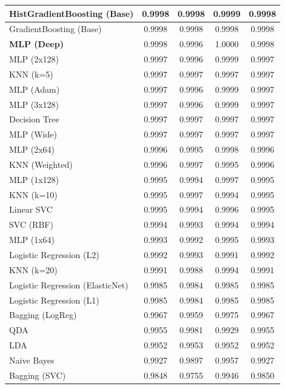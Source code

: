 \begin{small}
\begin{longtable}{|l|c|c|c|c|}
HistGradientBoosting (Base) & 0.9998 & 0.9998 & 0.9999 & 0.9998 \\ \hline
GradientBoosting (Base) & 0.9998 & 0.9998 & 0.9998 & 0.9998 \\ \hline
\textbf{MLP (Deep)} & 0.9998 & 0.9996 & 1.0000 & 0.9998 \\ \hline
MLP (2x128) & 0.9997 & 0.9996 & 0.9999 & 0.9997 \\ \hline
KNN (k=5) & 0.9997 & 0.9997 & 0.9997 & 0.9997 \\ \hline
MLP (Adam) & 0.9997 & 0.9996 & 0.9999 & 0.9997 \\ \hline
MLP (3x128) & 0.9997 & 0.9996 & 0.9999 & 0.9997 \\ \hline
Decision Tree & 0.9997 & 0.9997 & 0.9997 & 0.9997 \\ \hline
MLP (Wide) & 0.9997 & 0.9997 & 0.9997 & 0.9997 \\ \hline
MLP (2x64) & 0.9996 & 0.9995 & 0.9998 & 0.9996 \\ \hline
KNN (Weighted) & 0.9996 & 0.9997 & 0.9995 & 0.9996 \\ \hline
MLP (1x128) & 0.9995 & 0.9994 & 0.9997 & 0.9995 \\ \hline
KNN (k=10) & 0.9995 & 0.9997 & 0.9994 & 0.9995 \\ \hline
Linear SVC & 0.9995 & 0.9994 & 0.9996 & 0.9995 \\ \hline
SVC (RBF) & 0.9994 & 0.9993 & 0.9994 & 0.9994 \\ \hline
MLP (1x64) & 0.9993 & 0.9992 & 0.9995 & 0.9993 \\ \hline
Logistic Regression (L2) & 0.9992 & 0.9993 & 0.9991 & 0.9992 \\ \hline
KNN (k=20) & 0.9991 & 0.9988 & 0.9994 & 0.9991 \\ \hline
Logistic Regression (ElasticNet) & 0.9985 & 0.9984 & 0.9985 & 0.9985 \\ \hline
Logistic Regression (L1) & 0.9985 & 0.9984 & 0.9985 & 0.9985 \\ \hline
Bagging (LogReg) & 0.9967 & 0.9959 & 0.9975 & 0.9967 \\ \hline
QDA & 0.9955 & 0.9981 & 0.9929 & 0.9955 \\ \hline
LDA & 0.9952 & 0.9953 & 0.9952 & 0.9952 \\ \hline
Naive Bayes & 0.9927 & 0.9897 & 0.9957 & 0.9927 \\ \hline
Bagging (SVC) & 0.9848 & 0.9755 & 0.9946 & 0.9850 \\ \hline

\end{longtable}
\end{small}